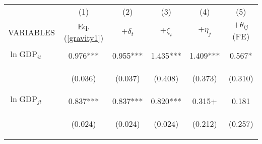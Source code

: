 \begin{center}
\begin{tabular}{lccccc} \hline
 & (1) & (2) & (3) & (4) & (5) \\
VARIABLES & Eq. (\ref{gravity1}) & $+\delta_t$ & $+\zeta_i$ & $+\eta_j$ & $+\theta_{ij}$ (FE) \\ \hline
\vspace{4pt} & \begin{footnotesize}\end{footnotesize} & \begin{footnotesize}\end{footnotesize} & \begin{footnotesize}\end{footnotesize} & \begin{footnotesize}\end{footnotesize} & \begin{footnotesize}\end{footnotesize} \\
$\ln\text{GDP}_{it}$ & 0.976*** & 0.955*** & 1.435*** & 1.409*** & 0.567* \\
\vspace{4pt} & \begin{footnotesize}(0.036)\end{footnotesize} & \begin{footnotesize}(0.037)\end{footnotesize} & \begin{footnotesize}(0.408)\end{footnotesize} & \begin{footnotesize}(0.373)\end{footnotesize} & \begin{footnotesize}(0.310)\end{footnotesize} \\
$\ln\text{GDP}_{jt}$ & 0.837*** & 0.837*** & 0.820*** & 0.315+ & 0.181 \\
\vspace{4pt} & \begin{footnotesize}(0.024)\end{footnotesize} & \begin{footnotesize}(0.024)\end{footnotesize} & \begin{footnotesize}(0.024)\end{footnotesize} & \begin{footnotesize}(0.212)\end{footnotesize} & \begin{footnotesize}(0.257)\end{footnotesize} \\

\end{tabular}
\end{center}
